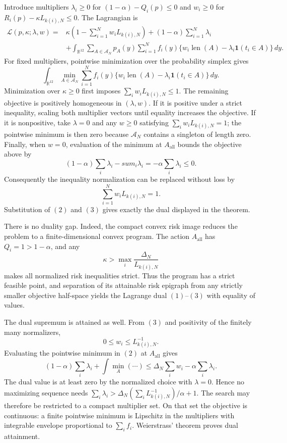 Introduce multipliers \(\lambda_i\geq0\) for
\((1-\alpha)-Q_i(p)\leq0\) and \(w_i\geq0\) for
\(R_i(p)-\kappa L_{k(i),N}\leq0\).  The Lagrangian is
\[
\begin{split}
 \mathcal L(p,\kappa;\lambda,w)
 ={}&\kappa\left(1-\sum_{i=1}^Nw_iL_{k(i),N}\right)
 +(1-\alpha)\sum_{i=1}^N\lambda_i\\
 &+\int_{\mathbb R^{12}}\sum_{A\in\mathcal A_N}p_A(y)
 \sum_{i=1}^N f_i(y)
 \{w_i\operatorname{len}(A)-\lambda_i\mathbf1(t_i\in A)\}\,dy.
\end{split}
\tag{1}
\]
For fixed multipliers, pointwise minimization over the probability simplex gives
\[
 \int_{\mathbb R^{12}}\min_{A\in\mathcal A_N}
 \sum_{i=1}^N f_i(y)
 \{w_i\operatorname{len}(A)-\lambda_i\mathbf1(t_i\in A)\}\,dy.
\tag{2}
\]
Minimization over \(\kappa\geq0\) first imposes
\(\sum_iw_iL_{k(i),N}\leq1\).  The remaining objective is positively homogeneous in \((\lambda,w)\).  If it is positive under a strict inequality, scaling both multiplier vectors until equality increases the objective.  If it is nonpositive, take \(\lambda=0\) and any \(w\geq0\) satisfying \(\sum_iw_iL_{k(i),N}=1\); the pointwise minimum is then zero because \(\mathcal A_N\) contains a singleton of length zero.  Finally, when \(w=0\), evaluation of the minimum at \(A_{\mathrm{all}}\) bounds the objective above by
\[
 (1-\alpha)\sum_i\lambda_i-sum_i\lambda_i
 =-\alpha\sum_i\lambda_i\leq0.
\]
Consequently the inequality normalization can be replaced without loss by
\[
 \sum_{i=1}^Nw_iL_{k(i),N}=1.
\tag{3}
\]
Substitution of \((2)\) and \((3)\) gives exactly the dual displayed in the theorem.

There is no duality gap.  Indeed, the compact convex risk image reduces the problem to a finite-dimensional convex program.  The action \(A_{\mathrm{all}}\) has \(Q_i=1>1-\alpha\), and any
\[
 \kappa>\max_i\frac{\Delta_N}{L_{k(i),N}}
\]
makes all normalized risk inequalities strict.  Thus the program has a strict feasible point, and separation of its attainable risk epigraph from any strictly smaller objective half-space yields the Lagrange dual \((1)\)--\((3)\) with equality of values.

The dual supremum is attained as well.  From \((3)\) and positivity of the finitely many normalizers,
\[
 0\leq w_i\leq L_{k(i),N}^{-1}.
\]
Evaluating the pointwise minimum in \((2)\) at \(A_{\mathrm{all}}\) gives
\[
 (1-\alpha)\sum_i\lambda_i+\int\min_A(\cdots)
 \leq \Delta_N\sum_iw_i-\alpha\sum_i\lambda_i.
\tag{4}
\]
The dual value is at least zero by the normalized choice with \(\lambda=0\).  Hence no maximizing sequence needs \(\sum_i\lambda_i>\Delta_N(\sum_iL_{k(i),N}^{-1})/\alpha+1\).  The search may therefore be restricted to a compact multiplier set.  On that set the objective is continuous: a finite pointwise minimum is Lipschitz in the multipliers with integrable envelope proportional to \(\sum_i f_i\).  Weierstrass' theorem proves dual attainment.

